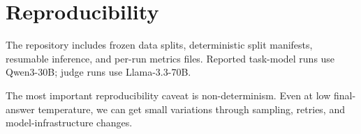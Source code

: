 \section{Reproducibility}

The repository includes frozen data splits, deterministic split manifests, resumable inference, and per-run metrics files. Reported task-model runs use Qwen3-30B; judge runs use Llama-3.3-70B.

The most important reproducibility caveat is non-determinism. Even at low final-answer temperature, we can get small variations through sampling, retries, and model-infrastructure changes.
